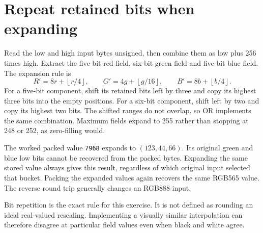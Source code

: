 \section{Repeat retained bits when expanding}\label{rgb-expansion}
Read the low and high input bytes unsigned, then combine them as low plus 256 times
high. Extract the five-bit red field, six-bit green field and five-bit blue field.
The expansion rule is
\[
  R'=8r+\left\lfloor r/4\right\rfloor,\qquad
  G'=4g+\left\lfloor g/16\right\rfloor,\qquad
  B'=8b+\left\lfloor b/4\right\rfloor.
\]
For a five-bit component, shift its retained bits left by three and copy its highest
three bits into the empty positions. For a six-bit component, shift left by two and
copy its highest two bits. The shifted ranges do not overlap, so OR implements
the same combination. Maximum fields expand to 255 rather than stopping at 248 or
252, as zero-filling would.

The worked packed value \texttt{7968} expands to $(123,44,66)$. Its original green
and blue low bits cannot be recovered from the packed bytes. Expanding the same
stored value always gives this result, regardless of which original input selected
that bucket. Packing the expanded values again recovers the same RGB565 value.
The reverse round trip generally changes an RGB888 input.

Bit repetition is the exact rule for this exercise. It is not defined as rounding
an ideal real-valued rescaling. Implementing a visually similar interpolation can
therefore disagree at particular field values even when black and white agree.
